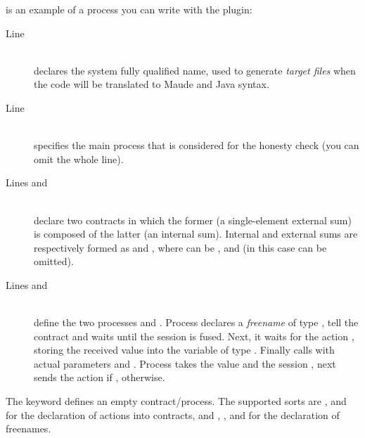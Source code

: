 
 is an example of a \coco process you can write with the plugin:
%
\begin{description}
	\item[\textnormal{Line }] \hfill \\
	declares the system fully qualified name, used to generate \textit{target files} when the code will be translated to Maude and Java syntax.
	\item[\textnormal{Line }] \hfill \\
	specifies the main process that is considered for the honesty check (you can omit the whole line).
	\item[\textnormal{Lines  and }] \hfill   \\
	declare two contracts in which the former (a single-element external sum) is composed of the latter (an internal sum). Internal and external sums are respectively formed as  
	  \incode{+}    \incode{+}   and 
	  \incode{(+)}    \incode{(+)}  , where  can be ,  and  (in this case can be omitted).
	\item[\textnormal{Lines  and }] \hfill \\
	define the two processes  and .	
	Process  declares a \textit{freename} of type , tell the contract  and waits until the session  is fused. Next, it waits for the action , storing the received value into the variable  of type . Finally calls  with actual parameters  and .	
	Process  takes the value  and the session , next sends the action  if ,  otherwise.
%
\end{description}

The keyword  defines an empty contract/process. The supported sorts are ,  and  for the declaration of actions into contracts, and , ,  and  for the declaration of freenames.

